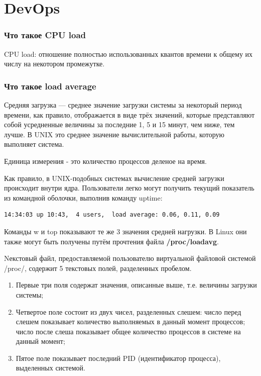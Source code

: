 \part{DevOps}

\section{Что такое CPU load}
CPU load: отношение полностью использованных квантов времени к общему их числу на некотором промежутке.

\section{Что такое load average}
Средняя загрузка — среднее значение загрузки системы за некоторый период времени, как правило, отображается в виде трёх значений, которые представляют собой усредненные величины за последние 1, 5 и 15 минут, чем ниже, тем лучше. В UNIX это среднее значение вычислительной работы, которую выполняет система.

Единица измерения - это количество процессов деленое на время.

Как правило, в UNIX-подобных системах вычисление средней загрузки происходит внутри ядра. Пользователи легко могут получить текущий показатель из командной оболочки, выполнив команду uptime: 

\begin{lstlisting}
14:34:03 up 10:43,  4 users,  load average: 0.06, 0.11, 0.09
\end{lstlisting}

Команды w и top показывают те же 3 значения средней нагрузки. В Linux они также могут быть получены путём прочтения файла \textbf{/proc/loadavg}. 

Nекстовый файл, предоставляемой пользователю виртуальной файловой системой /proc/, содержит 5 текстовых полей, разделенных пробелом. 
\begin{enumerate}
\item Первые три поля содержат значения, описанные выше, т.е. величины загрузки системы;
\item Четвертое поле состоит из двух чисел, разделенных слешем: число перед слешем показывает количество выполняемых в данный момент процессов; число после слеша показывает общее количество процессов в системе на данный момент;
\item Пятое поле показывает последний PID (идентификатор процесса), выделенных системой. 
\end{enumerate}

